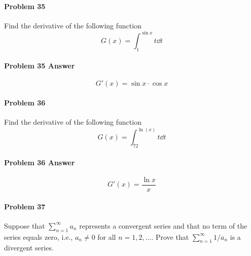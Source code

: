 \documentclass[a4paper, 11pt]{article}
\begin{document}

\paragraph{Problem 35}
Find the derivative of the following function
\[
	G(x) = \int_{1}^{\sin{x}} t \dd t
\]


\paragraph{Problem 35 Answer}
\[
	G'(x) = \sin{x} \cdot \cos{x}
\]


\paragraph{Problem 36}
Find the derivative of the following function
\[
	G(x) = \int_{72}^{\ln(x)} t \dd t
\]


\paragraph{Problem 36 Answer}
\[
	G'(x) = \frac{\ln x}{x}
\]


\paragraph{Problem 37}
Suppose that $\sum_{n=1}^{\infty} a_n$ represents a convergent series and that no term of the series equals zero, i.e., $a_n \neq 0$ for all $n=1,2, \dots$.
Prove that $\sum_{n=1}^{\infty} 1/a_n$ is a divergent series.

\end{document}
